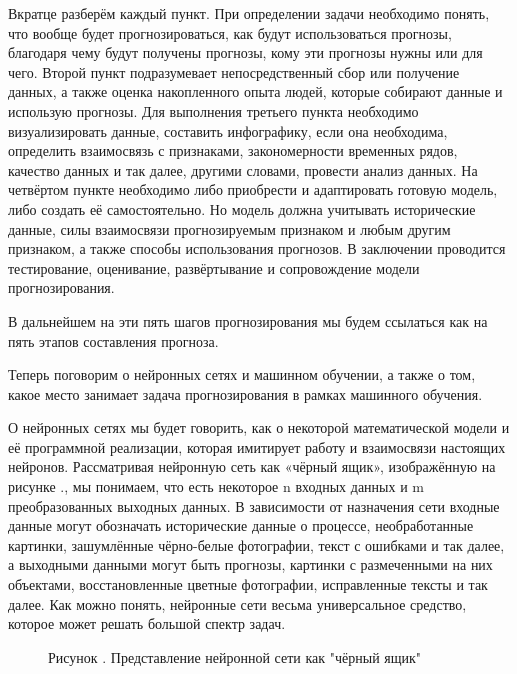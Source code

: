{	\par \redline Вкратце разберём каждый пункт. При определении задачи необходимо понять, что вообще будет прогнозироваться, как будут использоваться прогнозы, благодаря чему будут получены прогнозы, кому эти прогнозы нужны или для чего. Второй пункт подразумевает непосредственный сбор или получение данных, а также оценка накопленного опыта людей, которые собирают данные и использую прогнозы. Для выполнения третьего пункта необходимо визуализировать данные, составить инфографику, если она необходима, определить взаимосвязь с признаками, закономерности временных рядов, качество данных и так далее, другими словами, провести анализ данных. На четвёртом пункте необходимо либо приобрести и адаптировать готовую модель, либо создать её самостоятельно. Но модель должна учитывать исторические данные, силы взаимосвязи прогнозируемым признаком и любым другим признаком, а также способы использования прогнозов. В заключении проводится тестирование, оценивание, развёртывание и сопровождение модели прогнозирования. 
	
	\par \redline В дальнейшем на эти пять шагов прогнозирования мы будем ссылаться как на пять этапов составления прогноза.
	
	\par \redline Теперь поговорим о нейронных сетях и машинном обучении, а также о том, какое место занимает задача прогнозирования в рамках машинного обучения. 
	
	\par \redline О нейронных сетях мы будет говорить, как о некоторой математической модели и её программной реализации, которая имитирует работу и взаимосвязи настоящих нейронов.  Рассматривая нейронную сеть как «чёрный ящик», изображённую на рисунке \thechaptercntr .\theimagecntr \spc, мы понимаем, что есть некоторое n входных данных и m преобразованных выходных данных. В зависимости от назначения сети входные данные могут обозначать исторические данные о процессе, необработанные картинки, зашумлённые чёрно-белые фотографии, текст с ошибками и так далее, а выходными данными могут быть прогнозы, картинки с размеченными на них объектами, восстановленные цветные фотографии, исправленные тексты и так далее. Как можно понять, нейронные сети весьма универсальное средство, которое может решать большой спектр задач. 
	
	\begin{figure}[H]
		\centering
		\def\svgwidth{\textwidth}
		
		\caption*{\gostFont Рисунок \thechaptercntr .\theimagecntr \spc {--} Представление нейронной сети как "чёрный ящик"}
		\label{fig:NNBlackBox}
	\end{figure} \addtocounter{imagecntr}{1}
	
}
